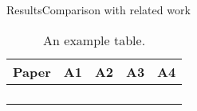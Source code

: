 \begin{frame}{Results}{Comparison with related work}
	\begin{table}
		\begin{tabular}{c|c|c|c|c}
			Paper & A1 & A2 & A3 & A4 \\\hline
				  &    &    &    & \\\hline
				  &    &    &    & \\\hline
				  &    &    &    & \\\hline
				  &    &    &    & 
		\end{tabular}
		\caption{\label{tab:Tableju} An example table.}
	\end{table}
\end{frame}
